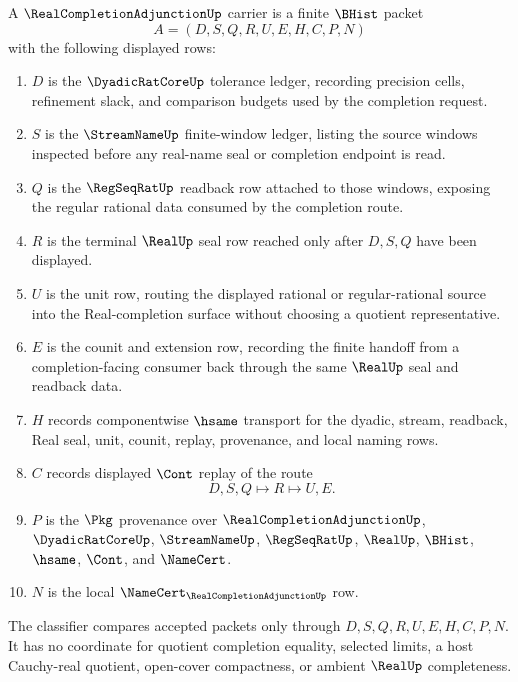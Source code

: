 \begin{definition}
\label{def:real-completion-adjunction-carrier}
A $\RealCompletionAdjunctionUp$ carrier is a finite $\BHist$ packet
$$
A=(D,S,Q,R,U,E,H,C,P,N)
$$
with the following displayed rows:
\begin{enumerate}
\item $D$ is the $\DyadicRatCoreUp$ tolerance ledger, recording precision cells, refinement slack, and comparison budgets used by the completion request.
\item $S$ is the $\StreamNameUp$ finite-window ledger, listing the source windows inspected before any real-name seal or completion endpoint is read.
\item $Q$ is the $\RegSeqRatUp$ readback row attached to those windows, exposing the regular rational data consumed by the completion route.
\item $R$ is the terminal $\RealUp$ seal row reached only after $D,S,Q$ have been displayed.
\item $U$ is the unit row, routing the displayed rational or regular-rational source into the Real-completion surface without choosing a quotient representative.
\item $E$ is the counit and extension row, recording the finite handoff from a completion-facing consumer back through the same $\RealUp$ seal and readback data.
\item $H$ records componentwise $\hsame$ transport for the dyadic, stream, readback, Real seal, unit, counit, replay, provenance, and local naming rows.
\item $C$ records displayed $\Cont$ replay of the route
$$
D,S,Q \longmapsto R \longmapsto U,E .
$$
\item $P$ is the $\Pkg$ provenance over $\RealCompletionAdjunctionUp$, $\DyadicRatCoreUp$, $\StreamNameUp$, $\RegSeqRatUp$, $\RealUp$, $\BHist$, $\hsame$, $\Cont$, and $\NameCert$.
\item $N$ is the local $\NameCert_{\RealCompletionAdjunctionUp}$ row.
\end{enumerate}
The classifier compares accepted packets only through $D,S,Q,R,U,E,H,C,P,N$. It has no coordinate for quotient completion equality, selected limits, a host Cauchy-real quotient, open-cover compactness, or ambient $\RealUp$ completeness.
\end{definition}

